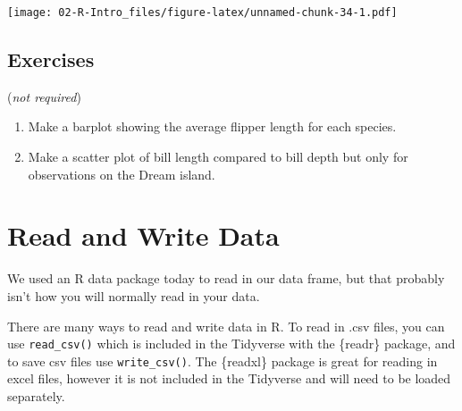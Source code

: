 \documentclass[
]{book}
\begin{document}
\texttt{[image: 02-R-Intro\_files/figure-latex/unnamed-chunk-34-1.pdf]}

\hypertarget{exercises-2}{%
\subsection{Exercises}\label{exercises-2}}

(\emph{not required})

\begin{enumerate}
\def\labelenumi{\arabic{enumi}.}
\item
  Make a barplot showing the average flipper length for each species.
\item
  Make a scatter plot of bill length compared to bill depth but only for observations on the Dream island.
\end{enumerate}

\hypertarget{read-and-write-data}{%
\section{Read and Write Data}\label{read-and-write-data}}

We used an R data package today to read in our data frame, but that probably isn't how you will normally read in your data.

There are many ways to read and write data in R. To read in .csv files, you can use \texttt{read\_csv()} which is included in the Tidyverse with the \{readr\} package, and to save csv files use \texttt{write\_csv()}. The \{readxl\} package is great for reading in excel files, however it is not included in the Tidyverse and will need to be loaded separately.

  
\end{document}
